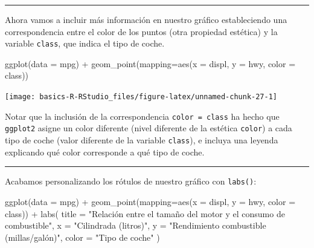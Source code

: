 \documentclass[
  degree=mecinf,
  title=normal,
  toc=normal,
  bib=normal]{mnye}
\newenvironment{Shaded}{\begin{snugshade}}{\end{snugshade}}
\newcommand{\AttributeTok}[1]{\textcolor[rgb]{0.77,0.63,0.00}{#1}}
\newcommand{\FunctionTok}[1]{\textcolor[rgb]{0.00,0.00,0.00}{#1}}
\newcommand{\NormalTok}[1]{#1}
\newcommand{\SpecialCharTok}[1]{\textcolor[rgb]{0.00,0.00,0.00}{#1}}
\newcommand{\StringTok}[1]{\textcolor[rgb]{0.31,0.60,0.02}{#1}}
\begin{document}
\begin{center}\rule{0.5\linewidth}{0.5pt}\end{center}

Ahora vamos a incluir más información en nuestro gráfico estableciendo una correspondencia entre el color de los puntos (otra propiedad estética) y la variable \texttt{class}, que indica el tipo de coche.

\begin{Shaded}
\begin{Highlighting}[]
\FunctionTok{ggplot}\NormalTok{(}\AttributeTok{data =}\NormalTok{ mpg) }\SpecialCharTok{+} 
    \FunctionTok{geom\_point}\NormalTok{(}\AttributeTok{mapping=}\FunctionTok{aes}\NormalTok{(}\AttributeTok{x =}\NormalTok{ displ, }\AttributeTok{y =}\NormalTok{ hwy, }\AttributeTok{color =}\NormalTok{ class))  }
\end{Highlighting}
\end{Shaded}

\begin{center}\texttt{[image: basics-R-RStudio\_files/figure-latex/unnamed-chunk-27-1]} \end{center}

Notar que la inclusión de la correspondencia \texttt{color\ =\ class} ha hecho que \texttt{ggplot2} asigne un color diferente (nivel diferente de la estética \texttt{color}) a cada tipo de coche (valor diferente de la variable \texttt{class}), e incluya una leyenda explicando qué color corresponde a qué tipo de coche.

\begin{center}\rule{0.5\linewidth}{0.5pt}\end{center}

Acabamos personalizando los rótulos de nuestro gráfico con \texttt{labs()}:

\begin{Shaded}
\begin{Highlighting}[]
\FunctionTok{ggplot}\NormalTok{(}\AttributeTok{data =}\NormalTok{ mpg) }\SpecialCharTok{+} 
    \FunctionTok{geom\_point}\NormalTok{(}\AttributeTok{mapping=}\FunctionTok{aes}\NormalTok{(}\AttributeTok{x =}\NormalTok{ displ, }\AttributeTok{y =}\NormalTok{ hwy, }\AttributeTok{color =}\NormalTok{ class)) }\SpecialCharTok{+}
    \FunctionTok{labs}\NormalTok{(}
        \AttributeTok{title =} \StringTok{"Relación entre el tamaño del motor y el consumo de combustible"}\NormalTok{, }
        \AttributeTok{x =} \StringTok{"Cilindrada (litros)"}\NormalTok{,}
        \AttributeTok{y =} \StringTok{"Rendimiento combustible (millas/galón)"}\NormalTok{,}
        \AttributeTok{color =} \StringTok{"Tipo de coche"}
\NormalTok{     )}
\end{Highlighting}
\end{Shaded}
\end{document}
